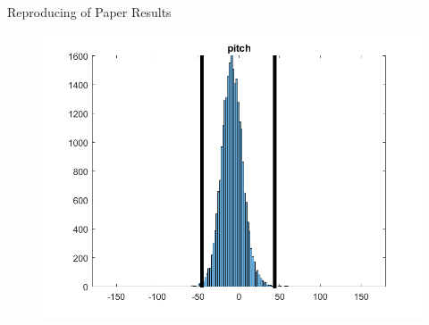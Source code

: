 \documentclass{beamer}
\begin{document}
\begin{frame}{Reproducing of Paper Results}
\begin{itemize}
\begin{figure}
\includegraphics[scale=0.15]{fig/pitch_dist}
\end{figure}
\end{itemize}

\end{frame}
\end{document}
